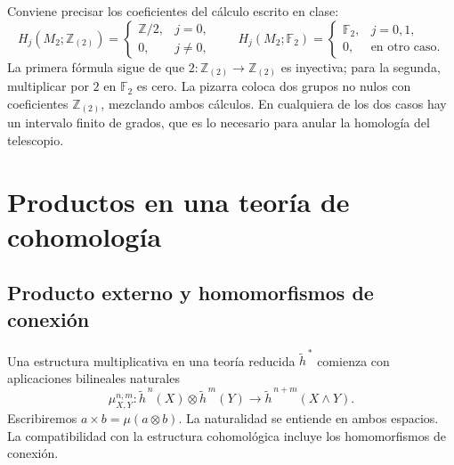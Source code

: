 Conviene precisar los coeficientes del cálculo escrito en clase:
\[
H_j(M_2;\mathbb Z_{(2)})=
\begin{cases}\mathbb Z/2,&j=0,\\0,&j\ne0,\end{cases}
\qquad
H_j(M_2;\mathbb F_2)=
\begin{cases}\mathbb F_2,&j=0,1,\\0,&\text{en otro caso}.\end{cases}
\]
La primera fórmula sigue de que $2\colon\mathbb Z_{(2)}\to\mathbb Z_{(2)}$ es inyectiva; para la segunda, multiplicar por $2$ en $\mathbb F_2$ es cero. La pizarra coloca dos grupos no nulos con coeficientes $\mathbb Z_{(2)}$, mezclando ambos cálculos. En cualquiera de los dos casos hay un intervalo finito de grados, que es lo necesario para anular la homología del telescopio.

\section{Productos en una teoría de cohomología}

\subsection{Producto externo y homomorfismos de conexión}
Una estructura multiplicativa en una teoría reducida $\widetilde h^{\,*}$ comienza con aplicaciones bilineales naturales
\[
\mu_{X,Y}^{n,m}\colon
\widetilde h^{\,n}(X)\otimes\widetilde h^{\,m}(Y)
\longrightarrow\widetilde h^{\,n+m}(X\wedge Y).
\]
Escribiremos $a\times b=\mu(a\otimes b)$. La naturalidad se entiende en ambos espacios. La compatibilidad con la estructura cohomológica incluye los homomorfismos de conexión.


